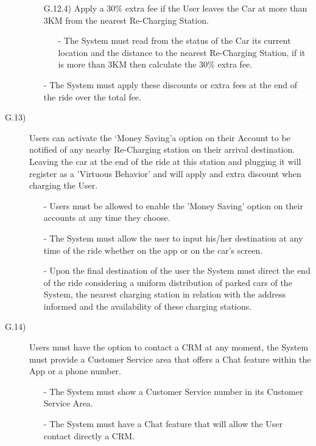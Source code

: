 \documentclass[a4paper]{article}
\begin{document}
\begin{description}
\begin{itemize}
\begin{itemize}
	\end{itemize}
	\item [G.12.4)]Apply a 30\% extra fee if the User leaves the Car at more than 3KM from the nearest Re-Charging Station.
	\begin{itemize}
	\item[-]The System must read from the status of the Car its current location and the distance to the nearest Re-Charging Station, if it is more than 3KM then calculate the 30\% extra fee.
	\end{itemize}
	\item[-]The System must apply these discounts or extra fees at the end of the ride over the total fee.
\end{itemize}

\item [G.13)]Users can activate the `Money Saving'a option on their Account to be notified of any nearby Re-Charging station on their arrival destination. Leaving the car at the end of the ride at this station and plugging it will register as a 'Virtuous Behavior' and will apply and extra discount when charging the User.
\begin{itemize}
	\item[-]Users must be allowed to enable the 'Money Saving' option on their accounts at any time they choose.
	\item[-]The System must allow the user to input his/her destination at any time of the ride whether on the app or on the car's screen.
	\item[-]Upon the final destination of the user the System must direct the end of the ride considering a uniform distribution of parked cars of the System, the nearest charging station in relation with the address informed and  the availability of these charging stations.
\end{itemize}
\item [G.14)]Users must have the option to contact a CRM at any moment, the System must provide a Customer Service area that offers a Chat feature within the App or a phone number.
\begin{itemize}
	\item[-]The System must show a Customer Service number in its Customer Service Area.
	\item[-]The System must have a Chat feature that will allow the User contact directly a CRM.
\end{itemize}
\end{description}
\end{document}
